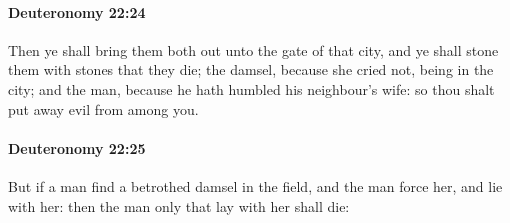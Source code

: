		\paragraph{Deuteronomy 22:24} %
			\label{DEUTERONOMY-22-24}

			Then ye shall bring them both out unto the gate of that city, and ye shall stone them with stones that they die; the damsel, because she cried not, being in the city; and the man, because he hath humbled his neighbour's wife: so thou shalt put away evil from among you.


		\paragraph{Deuteronomy 22:25} %
			\label{DEUTERONOMY-22-25}

			But if a man find a betrothed damsel in the field, and the man force her, and lie with her: then the man only that lay with her shall die:

